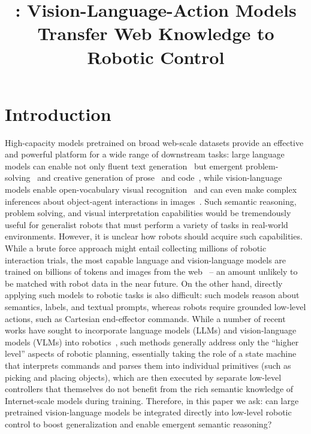 \title{\methodname: Vision-Language-Action Models Transfer Web Knowledge to Robotic Control}



\maketitle

\section{Introduction}
\label{sec:intro}

High-capacity models pretrained on broad web-scale datasets provide an effective and powerful platform for a wide range of downstream tasks: large language models can enable not only fluent text generation~\citep{brohan2022rt,openai2023gpt4,anil2023palm} but emergent problem-solving~\citep{cobbe2021training,lewkowycz2022solving,polu2022formal} and creative generation of prose~\citep{brown2020language,openai2023gpt4} and code~\citep{chen2021evaluating}, while vision-language models enable open-vocabulary visual recognition~\citep{radford2021learning,minderer2022simple,kirillov2023segment} and can even make complex inferences about object-agent interactions in images~\citep{alayrac2022flamingo,hao2022language,wang2022git,chen2023pali,chen2023palix,driess2023palm,huang2023language}. Such semantic reasoning, problem solving, and visual interpretation capabilities would be tremendously useful for generalist robots that must perform a variety of tasks in real-world environments. However, it is unclear how robots should acquire such capabilities. While a brute force approach might entail collecting millions of robotic interaction trials, the most capable language and vision-language models are trained on billions of tokens and images from the web~\citep{alayrac2022flamingo,chen2023pali,chen2023palix,huang2023language} -- an amount unlikely to be matched with robot data in the near future. On the other hand, directly applying such models to robotic tasks is also difficult: such models reason about semantics, labels, and textual prompts, whereas robots require grounded low-level actions, such as Cartesian end-effector commands. While a number of recent works have sought to incorporate language models (LLMs) and vision-language models (VLMs) into robotics~\citep{ahn2022can,driess2023palm,vemprala2023chatgpt}, such methods generally address only the ``higher level'' aspects of robotic planning, essentially taking the role of a state machine that interprets commands and parses them into individual primitives (such as picking and placing objects),
which are then executed by separate low-level controllers that themselves do not benefit from the rich semantic knowledge of Internet-scale models during training. Therefore, in this paper we ask: can large pretrained vision-language models be integrated directly into low-level robotic control to boost generalization and enable emergent semantic reasoning?

